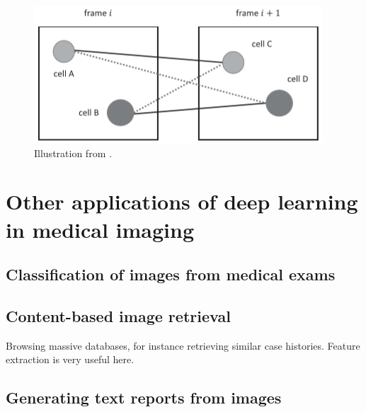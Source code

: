 \documentclass[11pt]{article} %
\begin{document}
\begin{figure}[h!]
  \centering
  \includegraphics[width=.75 \linewidth ]{tracking.png}
  \caption{Illustration from \cite{kan:machine}.}
  \label{fig:tracking}
\end{figure}




\section{Other applications of deep learning in medical imaging \cite{litjens:deeplearning}}
  \subsection{Classification of images from medical exams}
  \subsection{Content-based image retrieval}
    Browsing massive databases, for instance retrieving similar case histories. Feature extraction is very useful here.
  \subsection{Generating text reports from images \cite{schlegl:text}}
\end{document}
